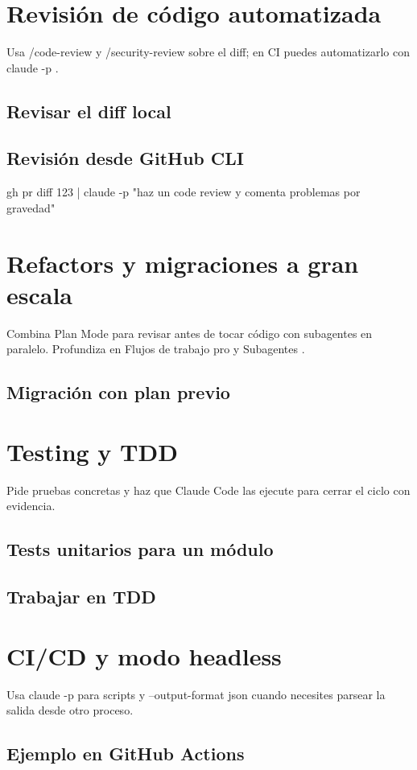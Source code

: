 \documentclass[11pt,a4paper]{book}
\begin{document}
\section{Revisión de código automatizada}
Usa /code-review y /security-review sobre el diff; en CI puedes automatizarlo con claude -p .

\subsection{Revisar el diff local}
\subsection{Revisión desde GitHub CLI}
\begin{codebox}
gh pr diff 123 | claude -p "haz un code review y comenta problemas por gravedad"
\end{codebox}
\section{Refactors y migraciones a gran escala}
Combina Plan Mode para revisar antes de tocar código con subagentes en paralelo. Profundiza en Flujos de trabajo pro y Subagentes .

\subsection{Migración con plan previo}
\section{Testing y TDD}
Pide pruebas concretas y haz que Claude Code las ejecute para cerrar el ciclo con evidencia.

\subsection{Tests unitarios para un módulo}
\subsection{Trabajar en TDD}
\section{CI/CD y modo headless}
Usa claude -p para scripts y --output-format json cuando necesites parsear la salida desde otro proceso.

\subsection{Ejemplo en GitHub Actions}
\end{document}
